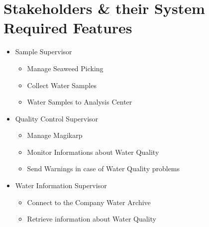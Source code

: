 \chapter{\textbf{Stakeholders \& their System Required Features}}
\begin{itemize}

\item{Sample Supervisor}

\begin{itemize}
\item{Manage Seaweed Picking}
\item{Collect Water Samples}
\item{Water Samples to Analysis Center}
\end{itemize}

\item{Quality Control Supervisor}

\begin{itemize}
\item{Manage Magikarp}
\item{Monitor Informations about Water Quality}
\item{Send Warnings in case of Water Quality problems}
\end{itemize}

\item{Water Information Supervisor}

\begin{itemize}
\item{Connect to the Company Water Archive}
\item{Retrieve information about Water Quality}
\end{itemize}

\end{itemize}